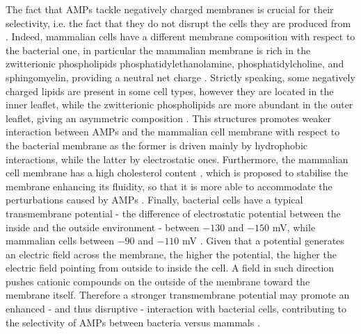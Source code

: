 The fact that AMPs tackle negatively charged membranes is crucial for their selectivity, i.e. the fact that they do not disrupt the cells they are produced from \cite{Glukhov2005}. Indeed, mammalian cells have a different membrane composition with  respect to the bacterial one, in particular the mammalian membrane is rich in the zwitterionic phospholipids phosphatidylethanolamine, phosphatidylcholine, and sphingomyelin, providing a neutral net charge \cite{Spector1985,vanMeer2008}.
%
Strictly speaking, some negatively charged lipids are present in some cell types, however they are located in the inner leaflet, while the zwitterionic phospholipids are more abundant in the outer leaflet, giving an asymmetric composition \cite{???}.
%
This structures promotes weaker interaction between AMPs and the mammalian cell membrane with respect to the bacterial membrane as the former is driven mainly by hydrophobic interactions, while the latter by electrostatic ones.
%
Furthermore, the mammalian cell membrane has a high cholesterol content \cite{Yeaman2003, Lai2009}, which is proposed to stabilise the membrane enhancing its fluidity, so that it is more able to accommodate the perturbations caused by AMPs \cite{Zasloff2002}.
%
Finally, bacterial cells have a typical transmembrane potential - the difference of electrostatic potential between the inside and the outside environment - between $-130$ and $-150$ mV, while mammalian cells between $-90$ and $-110$ mV \cite{Yeaman2003,Matsuzaki2009,Ebenhan2014}.
%
Given that a potential generates an electric field across the membrane, the higher the potential, the higher the electric field pointing from outside to inside the cell. A field in such direction pushes cationic compounds on the outside of the membrane toward the membrane itself. Therefore a stronger transmembrane potential may promote an enhanced - and thus disruptive - interaction with bacterial cells, contributing to the selectivity of AMPs between bacteria versus mammals \cite{Yeaman2003}.

